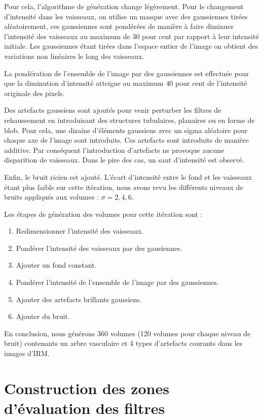 Pour cela, l'algorithme de génération change légèrement. Pour le changement d'intensité dans les vaisseaux, on utilise un masque avec des gaussiennes tirées aléatoirement, ces gaussiennes sont pondérées de manière à faire diminuer l'intensité des vaisseaux au maximum de $30$ pour cent par rapport à leur intensité initiale. Les gaussiennes étant tirées dans l'espace entier de l'image on obtient des variations non linéaires le long des vaisseaux.

La pondération de l'ensemble de l'image par des gaussiennes est effectuée pour que la diminution d'intensité atteigne au maximum $40$ pour cent de l'intensité originale des pixels.

Des artefacts gaussiens sont ajoutés pour venir perturber les filtres de rehaussement en introduisant des structures tubulaires, planaires ou en forme de blob. Pour cela, une dizaine d'éléments gaussiens avec un sigma aléatoire pour chaque axe de l'image sont introduits. Ces artefacts sont introduits de manière additive. Par conséquent l'introduction d'artefacts ne provoque aucune disparition de vaisseaux. Dans le pire des cas, un saut d'intensité est observé.

Enfin, le bruit ricien est ajouté. L'écart d'intensité entre le fond et les vaisseaux étant plus faible sur cette itération, nous avons revu les différents niveaux de bruits appliqués aux volumes : $\sigma={2,4,6}$.

Les étapes de génération des volumes pour cette itération sont :

\begin{enumerate}
  \item Redimensionner l'intensité des vaisseaux.
  \item Pondérer l'intensité des vaisseaux par des gausiennes.
  \item Ajouter un fond constant. 
  \item Pondérer l'intensité de l'ensemble de l'image par des gaussiennes.
  \item Ajouter des artefacts brillants gaussiens.
  \item Ajouter du bruit.
  \end{enumerate}

En conclusion, nous générons 360 volumes (120 volumes pour chaque niveau de bruit) contenants un arbre vasculaire et 4 types d'artefacts courants dans les images d'IRM.
 
\section{Construction des zones d'évaluation des filtres}

